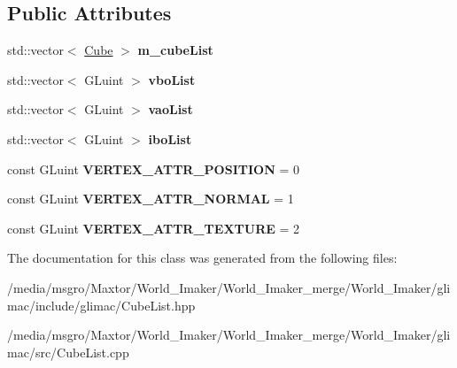 \subsection*{Public Attributes}
\begin{DoxyCompactItemize}
\item 
\mbox{\label{classglimac_1_1CubeList_a571bd6927341c00bba36750788a6eda8}} 
std\+::vector$<$ \hyperlink{classglimac_1_1Cube}{Cube} $>$ {\bfseries m\+\_\+cube\+List}
\item 
\mbox{\label{classglimac_1_1CubeList_abd897d76c4194e98e406ecd276bfa67c}} 
std\+::vector$<$ G\+Luint $>$ {\bfseries vbo\+List}
\item 
\mbox{\label{classglimac_1_1CubeList_a3275ec3106283c5661d78bd5c547b5f0}} 
std\+::vector$<$ G\+Luint $>$ {\bfseries vao\+List}
\item 
\mbox{\label{classglimac_1_1CubeList_a1957da945ddd55800df7d190257db456}} 
std\+::vector$<$ G\+Luint $>$ {\bfseries ibo\+List}
\item 
\mbox{\label{classglimac_1_1CubeList_afd0c91ad6e9b8ec2d2e764d8594fd6df}} 
const G\+Luint {\bfseries V\+E\+R\+T\+E\+X\+\_\+\+A\+T\+T\+R\+\_\+\+P\+O\+S\+I\+T\+I\+ON} = 0
\item 
\mbox{\label{classglimac_1_1CubeList_a6e8ace9eaedb3df93cbb3f96ea6ad993}} 
const G\+Luint {\bfseries V\+E\+R\+T\+E\+X\+\_\+\+A\+T\+T\+R\+\_\+\+N\+O\+R\+M\+AL} = 1
\item 
\mbox{\label{classglimac_1_1CubeList_a0532ab3a5ceaa052c6f859a1e08ede62}} 
const G\+Luint {\bfseries V\+E\+R\+T\+E\+X\+\_\+\+A\+T\+T\+R\+\_\+\+T\+E\+X\+T\+U\+RE} = 2
\end{DoxyCompactItemize}


The documentation for this class was generated from the following files\+:\begin{DoxyCompactItemize}
\item 
/media/msgro/\+Maxtor/\+World\+\_\+\+Imaker/\+World\+\_\+\+Imaker\+\_\+merge/\+World\+\_\+\+Imaker/glimac/include/glimac/Cube\+List.\+hpp\item 
/media/msgro/\+Maxtor/\+World\+\_\+\+Imaker/\+World\+\_\+\+Imaker\+\_\+merge/\+World\+\_\+\+Imaker/glimac/src/Cube\+List.\+cpp\end{DoxyCompactItemize}
